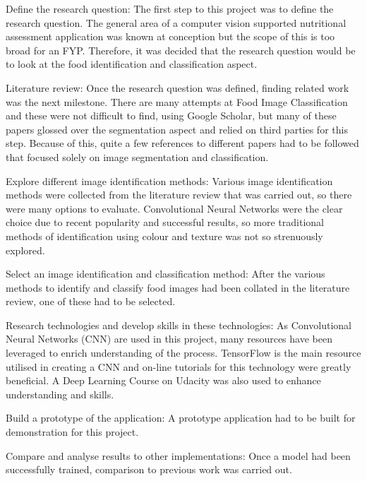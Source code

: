 \begin{enumerate}
\item{Define the research question:
The first step to this project was to define the research question.
The general area of a computer vision supported nutritional assessment application was known at conception but the scope of this is too broad for an FYP.
Therefore, it was decided that the research question would be to look at the food identification and classification aspect.}

\item{Literature review:
Once the research question was defined, finding related work was the next milestone.
There are many attempts at Food Image Classification and these were not difficult to find, using Google Scholar, but many of these papers glossed over the segmentation aspect and relied on third parties for this step.
Because of this, quite a few references to different papers had to be followed that focused solely on image segmentation and classification.}

\item{Explore different image identification methods:
Various image identification methods were collected from the literature review
that was carried out, so there were many options to evaluate.
Convolutional Neural Networks were the clear choice due to recent popularity and successful results, so more traditional methods of identification using colour and texture was not so strenuously explored.}

\item{{Select an image identification and classification method:
After the various methods to identify and classify food images had been collated in the literature review, one of these had to be selected.}

\item{Research technologies and develop skills in these technologies:
As Convolutional Neural Networks (CNN) are used in this project, many resources have been leveraged to enrich understanding of the process.
TensorFlow is the main resource utilised in creating a CNN and on-line tutorials for this technology were greatly beneficial.
A Deep Learning Course on Udacity was also used to enhance understanding and skills.}

\item{Build a prototype of the application:
A prototype application had to be built for demonstration for this project.}

\item{Compare and analyse results to other implementations:
Once a model had been successfully trained, comparison to previous work was carried out.}

}
\end{enumerate}
